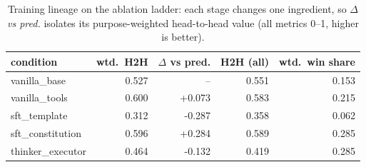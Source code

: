 \begin{table}[t]
  \centering
  \caption{Training lineage on the ablation ladder: each stage changes one ingredient, so \emph{$\Delta$ vs pred.} isolates its purpose-weighted head-to-head value (all metrics 0--1, higher is better).}
  \label{tab:rank-lineage}
  \begin{tabular}{lrrrr}
    \toprule
    condition & wtd.\ H2H & $\Delta$ vs pred. & H2H (all) & wtd.\ win share \\
    \midrule
    vanilla\_base & 0.527 & -- & 0.551 & 0.153 \\
    vanilla\_tools & 0.600 & +0.073 & 0.583 & 0.215 \\
    sft\_template & 0.312 & -0.287 & 0.358 & 0.062 \\
    sft\_constitution & 0.596 & +0.284 & 0.589 & 0.285 \\
    thinker\_executor & 0.464 & -0.132 & 0.419 & 0.285 \\
    \bottomrule
  \end{tabular}
\end{table}
